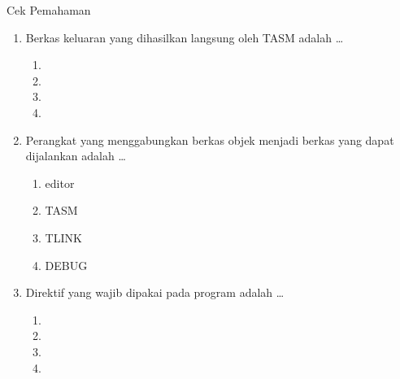 \documentclass[aspectratio=169,11pt]{beamer}
\begin{document}
\begin{frame}{Cek Pemahaman}
\footnotesize
\begin{enumerate}
    \item Berkas keluaran yang dihasilkan langsung oleh TASM adalah
          \dots
          \begin{enumerate}
              \item {} \quad \item {} \quad
              \item {} \quad \item {}
          \end{enumerate}

    \vspace{0.2em}
    \item Perangkat yang menggabungkan berkas objek menjadi berkas
          yang dapat dijalankan adalah \dots
          \begin{enumerate}
              \item editor \quad \item TASM \quad
              \item TLINK \quad \item DEBUG
          \end{enumerate}

    \vspace{0.2em}
    \item Direktif yang wajib dipakai pada program 
          adalah \dots
          \begin{enumerate}
              \item {} \quad \item {} \quad
              \item {} \quad \item {}
          \end{enumerate}
\end{enumerate}
\end{frame}
\end{document}
